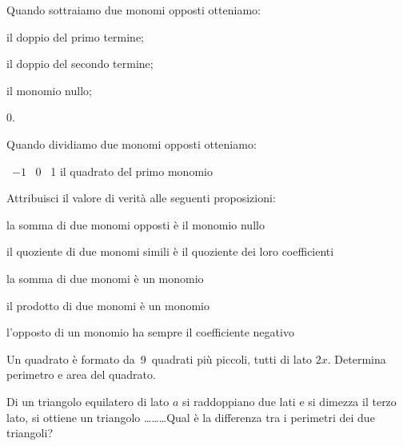 \begin{esercizio}
 \label{ese:9.38}
Quando sottraiamo due monomi opposti otteniamo:
\begin{enumeratea}
\item il doppio del primo termine;
\item il doppio del secondo termine;
\item il monomio nullo;
\item 0.
\end{enumeratea}
\end{esercizio}

\begin{esercizio}
 \label{ese:9.39}
Quando dividiamo due monomi opposti otteniamo:
\begin{center}
\boxA\quad~$-1$
\quad\boxB\quad~0
\quad\boxC\quad~1
\quad\boxD\quad il quadrato del primo monomio
\end{center}
\end{esercizio}

\begin{esercizio}
 \label{ese:9.40}
Attribuisci il valore di verità alle seguenti proposizioni:
\TabPositions{11cm}
\begin{enumeratea}
 \item la somma di due monomi opposti è il monomio nullo \tab\boxV\quad\boxF
 \item il quoziente di due monomi simili è il quoziente dei loro coefficienti \tab\boxV\quad\boxF
 \item la somma di due monomi è un monomio \tab\boxV\quad\boxF
 \item il prodotto di due monomi è un monomio \tab\boxV\quad\boxF
 \item l'opposto di un monomio ha sempre il coefficiente negativo \tab\boxV\quad\boxF
\end{enumeratea}
\end{esercizio}

\begin{esercizio}[\Ast]
 \label{ese:9.41}
Un quadrato è formato da~9~quadrati più piccoli, tutti di lato $ 2x $. Determina perimetro e area del quadrato.
\end{esercizio}

\begin{esercizio}[\Ast]
 \label{ese:9.42}
Di un triangolo equilatero di lato $ a $ si raddoppiano due lati e si dimezza il terzo lato, si ottiene un triangolo \ldots\ldots\ldots Qual è la differenza tra i perimetri dei due triangoli?
\end{esercizio}

